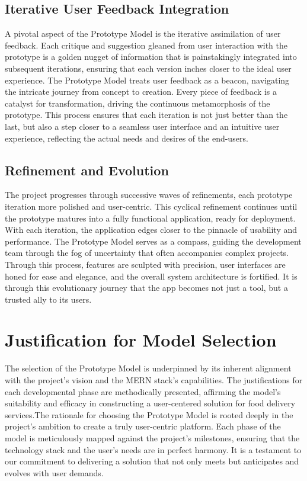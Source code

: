 \documentclass{article}
\begin{document}
\subsection{Iterative User Feedback Integration}
A pivotal aspect of the Prototype Model is the iterative assimilation of user feedback. Each critique and suggestion gleaned from user interaction with the prototype is a golden nugget of information that is painstakingly integrated into subsequent iterations, ensuring that each version inches closer to the ideal user experience. The Prototype Model treats user feedback as a beacon, navigating the intricate journey from concept to creation. Every piece of feedback is a catalyst for transformation, driving the continuous metamorphosis of the prototype. This process ensures that each iteration is not just better than the last, but also a step closer to a seamless user interface and an intuitive user experience, reflecting the actual needs and desires of the end-users.

\subsection{Refinement and Evolution}
The project progresses through successive waves of refinements, each prototype iteration more polished and user-centric. This cyclical refinement continues until the prototype matures into a fully functional application, ready for deployment. With each iteration, the application edges closer to the pinnacle of usability and performance. The Prototype Model serves as a compass, guiding the development team through the fog of uncertainty that often accompanies complex projects. Through this process, features are sculpted with precision, user interfaces are honed for ease and elegance, and the overall system architecture is fortified. It is through this evolutionary journey that the app becomes not just a tool, but a trusted ally to its users.

\section{Justification for Model Selection}
The selection of the Prototype Model is underpinned by its inherent alignment with the project’s vision and the MERN stack’s capabilities. The justifications for each developmental phase are methodically presented, affirming the model’s suitability and efficacy in constructing a user-centered solution for food delivery services.The rationale for choosing the Prototype Model is rooted deeply in the project's ambition to create a truly user-centric platform. Each phase of the model is meticulously mapped against the project's milestones, ensuring that the technology stack and the user's needs are in perfect harmony. It is a testament to our commitment to delivering a solution that not only meets but anticipates and evolves with user demands.
\end{document}
